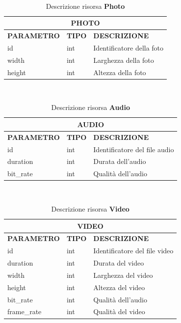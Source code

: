 \ \linebreak
\begin{table}[!h]
\centering
	\begin{tabular}{@{}lll@{}}
		\toprule
		\multicolumn{3}{c}{\textbf{PHOTO}}                             \\ \midrule
		\textbf{PARAMETRO} & \textbf{TIPO} & \textbf{DESCRIZIONE}      \\
		id                 & int           & Identificatore della foto \\
		width              & int           & Larghezza della foto      \\
		height             & int           & Altezza della foto        \\ \bottomrule
	\end{tabular}
\caption{Descrizione risorsa \textbf{Photo}}\label{etichetta}
\end{table}

\ \linebreak
\begin{table}[!h]
\centering
	\begin{tabular}{@{}lll@{}}
		\toprule
		\multicolumn{3}{c}{\textbf{AUDIO}}                                 \\ \midrule
		\textbf{PARAMETRO} & \textbf{TIPO} & \textbf{DESCRIZIONE}          \\
		id                 & int           & Identificatore del file audio \\
		duration           & int           & Durata dell'audio             \\
		bit\_rate          & int           & Qualità dell'audio            \\ \bottomrule
	\end{tabular}
\caption{Descrizione risorsa \textbf{Audio}}\label{etichetta}
\end{table}

\ \linebreak
\begin{table}[!h]
\centering
	\begin{tabular}{@{}lll@{}}
		\toprule
		\multicolumn{3}{c}{\textbf{VIDEO}}                                 \\ \midrule
		\textbf{PARAMETRO} & \textbf{TIPO} & \textbf{DESCRIZIONE}          \\
		id                 & int           & Identificatore del file video \\
		duration           & int           & Durata del video              \\
		width              & int           & Larghezza del video           \\
		height             & int           & Altezza del video             \\
		bit\_rate          & int           & Qualità dell'audio            \\
		frame\_rate        & int           & Qualità del video             \\ \bottomrule
	\end{tabular}
\caption{Descrizione risorsa \textbf{Video}}\label{etichetta}
\end{table}


